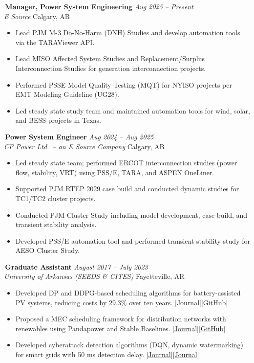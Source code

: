 \documentclass[11pt, letterpaper]{article}
\begin{document}
\textbullet\,\textbf{Manager, Power System Engineering} \hfill \textit{Aug 2025 -- Present} \\
\textit{E Source} \hfill Calgary, AB
\begin{itemize}
  \item Lead PJM M-3 Do-No-Harm (DNH) Studies and develop automation tools via the TARAViewer API.
  \item Lead MISO Affected System Studies and Replacement/Surplus Interconnection Studies for generation interconnection projects.
  \item Performed PSS\textregistered E Model Quality Testing (MQT) for NYISO projects per EMT Modeling Guideline (UG28).
  \item Led steady state study team and maintained automation tools for wind, solar, and BESS projects in Texas.
\end{itemize}

\textbullet\,\textbf{Power System Engineer} \hfill \textit{Aug 2024 -- Aug 2025} \\
\textit{CF Power Ltd.\ -- an E Source Company} \hfill Calgary, AB
\begin{itemize}
  \item Led steady state team; performed ERCOT interconnection studies (power flow, stability, VRT) using PSS/E, TARA, and ASPEN OneLiner.
  \item Supported PJM RTEP 2029 case build and conducted dynamic studies for TC1/TC2 cluster projects.
  \item Conducted PJM Cluster Study including model development, case build, and transient stability analysis.
  \item Developed PSS/E automation tool and performed transient stability study for AESO Cluster Study.
\end{itemize}

\textbullet\,\textbf{Graduate Assistant} \hfill \textit{August 2017 -- July 2023} \\
\textit{University of Arkansas (SEEDS \& CITES)} \hfill Fayetteville, AR
\begin{itemize}
  \item Developed DP and DDPG-based scheduling algorithms for battery-assisted PV systems, reducing costs by 29.3\% over ten years. [\href{https://ieeexplore.ieee.org/document/9001583}{Journal}][\href{https://github.com/Arthurliyaze}{GitHub}]
  \item Proposed a MEC scheduling framework for distribution networks with renewables using Pandapower and Stable Baselines. [\href{https://ieeexplore.ieee.org/document/11045963}{Journal}][\href{https://github.com/Arthurliyaze}{GitHub}]
  \item Developed cyberattack detection algorithms (DQN, dynamic watermarking) for smart grids with 50 ms detection delay. [\href{https://www.sciencedirect.com/science/article/pii/S0142061522003404}{Journal}][\href{https://ieeexplore.ieee.org/document/10297604}{Journal}]
\end{itemize}
\end{document}
